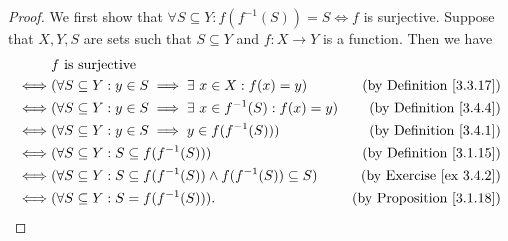 \begin{proof}
    We first show that \(\forall S \subseteq Y : f(f^{-1}(S)) = S \iff f\) is surjective.
    Suppose that \(X, Y, S\) are sets such that \(S \subseteq Y\) and \(f : X \to Y\) is a function.
    Then we have
    \begin{align*}
             & f \text{ is surjective}                                                                                                  \\
        \iff & (\forall S \subseteq Y : y \in S \implies \exists\ x \in X : f(x) = y)            & \text{(by Definition \ref{3.3.17})}  \\
        \iff & (\forall S \subseteq Y : y \in S \implies \exists\ x \in f^{-1}(S) : f(x) = y)    & \text{(by Definition \ref{3.4.4})}   \\
        \iff & (\forall S \subseteq Y : y \in S \implies y \in f(f^{-1}(S)))                     & \text{(by Definition \ref{3.4.1})}   \\
        \iff & (\forall S \subseteq Y : S \subseteq f(f^{-1}(S)))                                & \text{(by Definition \ref{3.1.15})}  \\
        \iff & (\forall S \subseteq Y : S \subseteq f(f^{-1}(S)) \land f(f^{-1}(S)) \subseteq S) & \text{(by Exercise \ref{ex 3.4.2})}  \\
        \iff & (\forall S \subseteq Y : S = f(f^{-1}(S))).                                       & \text{(by Proposition \ref{3.1.18})}
    \end{align*}


\end{proof}
